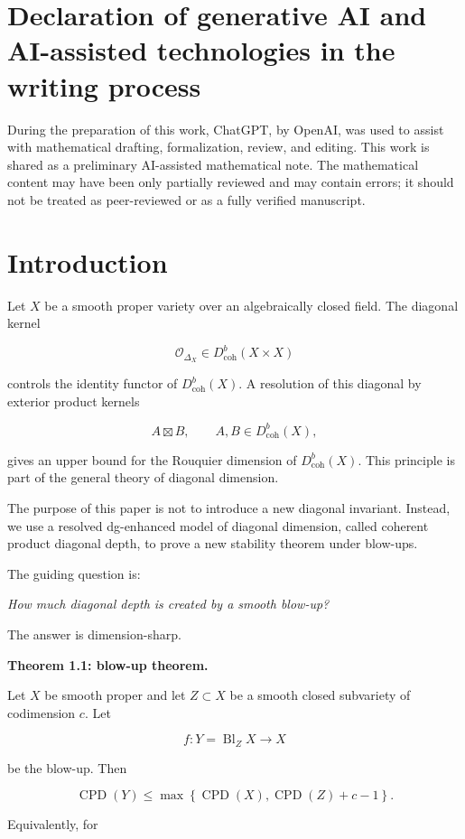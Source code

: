 \documentclass[11pt]{amsart}
\theoremstyle{definition}
\begin{document}
\section*{Declaration of generative AI and AI-assisted technologies in the writing process}
During the preparation of this work, ChatGPT, by OpenAI, was used to assist with mathematical drafting, formalization, review, and editing. This work is shared as a preliminary AI-assisted mathematical note. The mathematical content may have been only partially reviewed and may contain errors; it should not be treated as peer-reviewed or as a fully verified manuscript.

\section{Introduction}

Let $X$ be a smooth proper variety over an algebraically closed field. The diagonal kernel

\[
\mathcal O_{\Delta_X}\in D^b_{\mathrm{coh}}(X\times X)
\]

controls the identity functor of $D^b_{\mathrm{coh}}(X)$. A resolution of this diagonal by exterior product kernels

\[
A\boxtimes B,
\qquad
A,B\in D^b_{\mathrm{coh}}(X),
\]

gives an upper bound for the Rouquier dimension of $D^b_{\mathrm{coh}}(X)$. This principle is part of the general theory of diagonal dimension.

The purpose of this paper is not to introduce a new diagonal invariant. Instead, we use a resolved dg-enhanced model of diagonal dimension, called coherent product diagonal depth, to prove a new stability theorem under blow-ups.

The guiding question is:

\emph{How much diagonal depth is created by a smooth blow-up?}

The answer is dimension-sharp.

\noindent\textbf{Theorem 1.1: blow-up theorem.}

Let $X$ be smooth proper and let $Z\subset X$ be a smooth closed subvariety of codimension $c$. Let

\[
f:Y=\operatorname{Bl}_ZX\to X
\]

be the blow-up. Then

\[
\operatorname{CPD}(Y)
\le
\max\left\{
\operatorname{CPD}(X),
\operatorname{CPD}(Z)+c-1
\right\}.
\]

Equivalently, for
\end{document}
